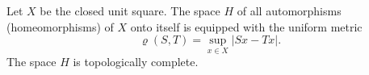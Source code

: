 Let $X$ be the closed unit square. The space $H$ of all automorphisms (homeomorphisms) of $X$ onto itself is equipped with the uniform metric
$$\varrho(S, T) = \sup_{x \in X} |Sx - Tx|.$$
The space $H$ is topologically complete.
